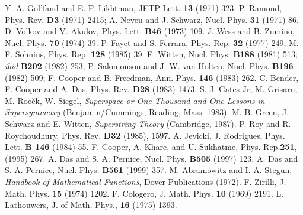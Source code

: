 \documentclass[a4paper,11pt]{article}
\begin{document}
\begin{thebibliography}{99}
 Y. A. Gol'fand and E. P. Likhtman, JETP Lett. {\bf 13}
(1971) 323.
 P. Ramond, Phys. Rev. {\bf D3} (1971) 2415; A. Neveu and
J. Schwarz, Nucl. Phys. {\bf 31} (1971) 86.
 D. Volkov and V. Akulov, Phys. Lett. {\bf B46} (1973)
109.
 J. Wess and B. Zumino, Nucl. Phys. {\bf 70} (1974) 39.
 P. Fayet and S. Ferrara, Phys. Rep. {\bf 32} (1977)
249; M. F. Sohnius,  Phys. Rep. {\bf 128} (1985) 39.
 E. Witten, Nucl. Phys. {\bf B188} (1981) 513; {\it ibid}
{\bf B202} (1982) 253; P. Salomonson and J. W. van Holten,
Nucl. Phys. {\bf B196} (1982) 509; F. Cooper and B. Freedman,
Ann. Phys. {\bf 146} (1983) 262.
 C. Bender, F. Cooper and A. Das, Phys. Rev. {\bf D28}
(1983) 1473.
S. J. Gates Jr, M. Grisaru, M. Roc\v{e}k, W. Siegel,
{\it Superspace or One Thousand and One Lessons in Supersymmetry}
(Benjamin/Cummings, Reading, Mass. 1983).
 M. B. Green, J. Schwarz and E. Witten, {\it Superstring
Theory} (Cambridge, 1987).
 P. Roy and R. Roychoudhury,  Phys. Rev.
 {\bf D32} (1985), 1597.
 A. Jevicki, J. Rodrigues, Phys. Lett. {\bf B
146} (1984) 55.
 F. Cooper, A. Khare, and U. Sukhatme,
Phys. Rep.{\bf 251}, (1995) 267.
 A. Das and S. A. Pernice, Nucl. Phys. {\bf B505} (1997)
123.
 A. Das and S. A. Pernice, Nucl. Phys. {\bf B561} (1999) 357.
 M. Abramowitz and I. A. Stegun, {\it Handbook
of Mathematical Functions}, Dover Publications (1972).
 F. Zirilli, J. Math. Phys. {\bf 15} (1974) 1202.
 F. Cologero, J. Math. Phys. {\bf 10} (1969) 2191.
 L. Lathouwers, J. of Math. Phys., {\bf 16}
(1975) 1393.

\end{thebibliography}
\end{document}
